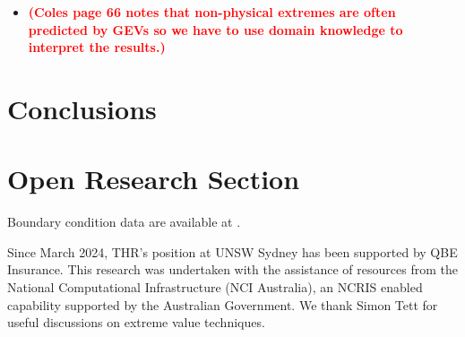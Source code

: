 \documentclass[]{agujournal2019}
\newcommand*{\todo}[1]{\textbf{\textcolor{red}{(#1)}}}
\begin{document}
\begin{itemize}
\item \todo{Coles page 66 notes that non-physical extremes are often predicted by GEVs so we have to use domain knowledge to interpret the results.}
\end{itemize}

\section{Conclusions}

\section*{Open Research Section}

Boundary condition data are available at .


\acknowledgments

Since March 2024, THR's position at UNSW Sydney has been supported by QBE Insurance. This research was undertaken with the assistance of resources from the National Computational Infrastructure (NCI Australia), an NCRIS enabled capability supported by the Australian Government. We thank Simon Tett for useful discussions on extreme value techniques.


\end{document}
